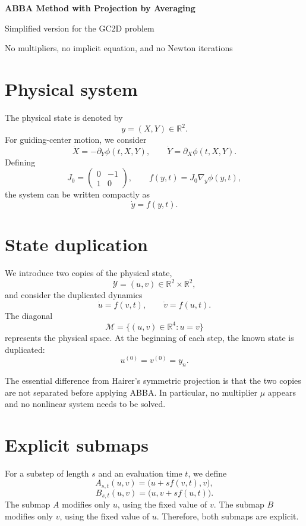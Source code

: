 \documentclass[11pt,a4paper]{article}
\newcommand{\R}{\mathbb{R}}
\newcommand{\Y}{\mathcal{Y}}
\newcommand{\M}{\mathcal{M}}
\begin{document}
\begin{center}
  {\LARGE\bfseries\color{blue}ABBA Method with Projection by Averaging}\par
  \vspace{0.35em}
  {\large Simplified version for the GC2D problem}\par
  \vspace{0.4em}
  {\small No multipliers, no implicit equation, and no Newton iterations}
\end{center}

\vspace{0.45em}

\section{Physical system}

The physical state is denoted by
\[
 y=(X,Y)\in\R^2.
\]
For guiding-center motion, we consider
\[
 \dot X=-\partial_Y\phi(t,X,Y),
 \qquad
 \dot Y=\partial_X\phi(t,X,Y).
\]
Defining
\[
 J_0=
 \begin{pmatrix}
  0&-1\\
  1&0
 \end{pmatrix},
 \qquad
 f(y,t)=J_0\nabla_y\phi(y,t),
\]
the system can be written compactly as
\[
 \dot y=f(y,t).
\]

\section{State duplication}

We introduce two copies of the physical state,
\[
 \Y=(u,v)\in\R^2\times\R^2,
\]
and consider the duplicated dynamics
\[
 \dot u=f(v,t),
 \qquad
 \dot v=f(u,t).
\]
The diagonal
\[
 \M=\{(u,v)\in\R^4:u=v\}
\]
represents the physical space. At the beginning of each step, the known state is duplicated:
\[
 \boxed{u^{(0)}=v^{(0)}=y_n.} \tag{1}
\]

The essential difference from Hairer's symmetric projection is that the two copies are
not separated before applying ABBA. In particular, no multiplier \(\mu\) appears and no
nonlinear system needs to be solved.

\section{Explicit submaps}

For a substep of length \(s\) and an evaluation time \(t\), we define
\[
 A_{s,t}(u,v)=\bigl(u+s f(v,t),v\bigr), \tag{2}
\]
\[
 B_{s,t}(u,v)=\bigl(u,v+s f(u,t)\bigr). \tag{3}
\]
The submap \(A\) modifies only \(u\), using the fixed value of \(v\). The submap \(B\)
modifies only \(v\), using the fixed value of \(u\). Therefore, both submaps are explicit.
\end{document}
